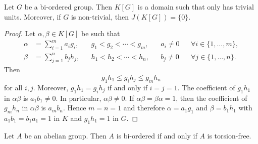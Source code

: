 \begin{theorem}
	\label{thm:BO}
	Let $G$ be a bi-ordered group. Then $K[G]$ is a domain such that
	only has trivial units. Moreover, if $G$ is non-trivial, 
	then $J(K[G])=\{0\}$. 
\end{theorem}

\begin{proof}
	Let $\alpha,\beta\in K[G]$ be such that  
	\begin{align*}
		\alpha&=\sum_{i=1}^m a_ig_i, && g_1<g_2<\cdots<g_m,&& a_i\ne 0 && \forall i\in\{1,\dots,m\},\\
		\beta&=\sum_{j=1}^n b_jh_j, && h_1<h_2<\cdots<h_n, && b_j\ne 0 && \forall j\in\{1,\dots,n\}.
	\end{align*}
	Then 
	\[
		g_1h_1\leq g_ih_j\leq g_mh_n
	\]
	for all $i,j$. Moreover, $g_1h_1=g_ih_j$ if and only if $i=j=1$. The
	coefficient of $g_1h_1$ in $\alpha\beta$ is $a_1b_1\ne 0$. In particular, 
	$\alpha\beta\ne0$. If $\alpha\beta=\beta\alpha=1$, then the coefficient of
	$g_mh_n$ in $\alpha\beta$ is $a_mb_n$. Hence $m=n=1$ and therefore 
	$\alpha=a_1g_1$ and $\beta=b_1h_1$ with $a_1b_1=b_1a_1=1$ in $K$ and $g_1h_1=1$
	in $G$.
\end{proof}

\begin{theorem}[Levi]
	\label{thm:Levi}
	Let $A$ be an abelian group. Then $A$ is bi-ordered if and only
	if $A$ is torsion-free.
\end{theorem}

